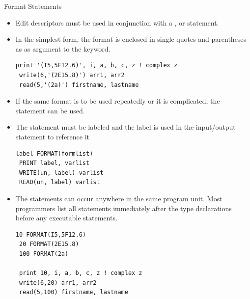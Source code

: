 \documentclass[10pt,t]{beamer}
\begin{document}
\begin{frame}{Format Statements}
  \begin{itemize}
    \item Edit descriptors must be used in conjunction with a ,  or  statement.
    \item In the simplest form, the format is enclosed in single quotes and parentheses as as argument to the keyword.
      \begin{lstlisting}[language={[90]Fortran}]
 print '(I5,5F12.6)', i, a, b, c, z ! complex z
 write(6,'(2E15.8)') arr1, arr2
 read(5,'(2a)') firstname, lastname
      \end{lstlisting}
      \item If the same format is to be used repeatedly or it is complicated, the  statement can be used.
      \item The  statement must be labeled and the label is used in the input/output statement to reference it
        \begin{lstlisting}[language={[90]Fortran}]
 label FORMAT(formlist)
 PRINT label, varlist
 WRITE(un, label) varlist
 READ(un, label) varlist
        \end{lstlisting}
      \item The  statements can occur anywhere in the same program unit. Most programmers list all  statements immediately after the type declarations before any executable statements.
        \begin{lstlisting}[language={[90]Fortran}]
 10 FORMAT(I5,5F12.6)
 20 FORMAT(2E15.8)
 100 FORMAT(2a)
 
 print 10, i, a, b, c, z ! complex z
 write(6,20) arr1, arr2
 read(5,100) firstname, lastname
        \end{lstlisting}
  \end{itemize}
\end{frame}
\end{document}
